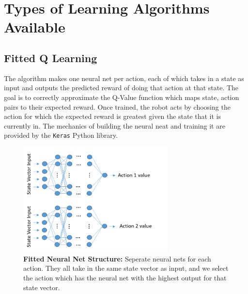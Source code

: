 \documentclass[onecolumn,letterpaper,11pt]{article}
\begin{document}
\section{Types of Learning Algorithms Available}

\subsection{Fitted Q Learning}
The algorithm makes one neural net per action, each of which takes in a state as input and outputs the predicted reward of doing that action at that state. The goal is to correctly approximate the Q-Value function which maps state, action pairs to their expected reward. Once trained, the robot acts by choosing the action for which the expected reward is greatest given the state that it is currently in. The mechanics of building the neural neat and training it are provided by the \texttt{Keras} Python library.

\begin{figure}[H]
	\centering 
	\includegraphics[width=0.7\textwidth]{../Images/fittedNet.png}
	\caption{{\bf Fitted Neural Net Structure:} Seperate neural nets for each action. They all take in the same state vector as input, and we select the action which has the neural net with the highest output for that state vector.}
	\label{fig_fitted_net}
\end{figure}
\end{document}
